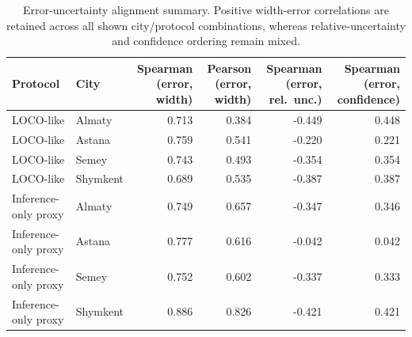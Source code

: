 \begin{table}[H]
\centering
\scriptsize
\caption{Error-uncertainty alignment summary. Positive width-error correlations are retained across all shown city/protocol combinations, whereas relative-uncertainty and confidence ordering remain mixed.}
\label{tab:error-alignment-unified}
\begin{tabular}{p{2.4cm}p{1.4cm}rrrr}
\toprule
Protocol & City & \shortstack{Spearman\\(error, width)} & \shortstack{Pearson\\(error, width)} & \shortstack{Spearman\\(error, rel.\ unc.)} & \shortstack{Spearman\\(error, confidence)} \\
\midrule
LOCO-like & Almaty   & 0.713 & 0.384 & -0.449 & 0.448 \\
LOCO-like & Astana   & 0.759 & 0.541 & -0.220 & 0.221 \\
LOCO-like & Semey    & 0.743 & 0.493 & -0.354 & 0.354 \\
LOCO-like & Shymkent & 0.689 & 0.535 & -0.387 & 0.387 \\
Inference-only proxy & Almaty   & 0.749 & 0.657 & -0.347 & 0.346 \\
Inference-only proxy & Astana   & 0.777 & 0.616 & -0.042 & 0.042 \\
Inference-only proxy & Semey    & 0.752 & 0.602 & -0.337 & 0.333 \\
Inference-only proxy & Shymkent & 0.886 & 0.826 & -0.421 & 0.421 \\
\bottomrule
\end{tabular}
\end{table}


